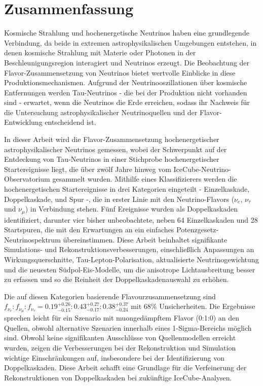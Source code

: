 \chapter{Zusammenfassung}
Kosmische Strahlung und hochenergetische Neutrinos haben eine grundlegende Verbindung, da beide in extremen astrophysikalischen Umgebungen entstehen, in denen kosmische Strahlung mit Materie oder Photonen in der Beschleunigungsregion interagiert und Neutrinos erzeugt. Die Beobachtung der Flavor-Zusammensetzung von Neutrinos bietet wertvolle Einblicke in diese Produktionsmechanismen. Aufgrund der Neutrinooszillationen über kosmische Entfernungen werden Tau-Neutrinos - die bei der Produktion nicht vorhanden sind - erwartet, wenn die Neutrinos die Erde erreichen, sodass ihr Nachweis für die Untersuchung astrophysikalischer Neutrinoquellen und der Flavor-Entwicklung entscheidend ist.

In dieser Arbeit wird die Flavor-Zusammensetzung hochenergetischer astrophysikalischer Neutrinos gemessen, wobei der Schwerpunkt auf der Entdeckung von Tau-Neutrinos in einer Stichprobe hochenergetischer Startereignisse liegt, die über zwölf Jahre hinweg vom IceCube-Neutrino-Observatorium gesammelt wurden. Mithilfe eines Klassifizierers werden die hochenergetischen Startereignisse in drei Kategorien eingeteilt - Einzelkaskade, Doppelkaskade, und Spur -, die in erster Linie mit den Neutrino-Flavors (\( \nu_e \), \( \nu_\tau \) und \( \nu_\mu \)) in Verbindung stehen. Fünf Ereignisse wurden als Doppelkaskaden identifiziert, darunter vier bisher unbeobachtete, neben 64 Einzelkaskaden und 28 Startspuren, die mit den Erwartungen an ein einfaches Potenzgesetz-Neutrinospektrum übereinstimmen. Diese Arbeit beinhaltet signifikante Simulations- und Rekonstruktionsverbesserungen, einschließlich Anpassungen an Wirkungsquerschnitte, Tau-Lepton-Polarisation, aktualisierte Neutrinogewichtung und die neuesten Südpol-Eis-Modelle, um die anisotrope Lichtausbreitung besser zu erfassen und so die Reinheit der Doppelkaskadenauswahl zu erhöhen.

Die auf diesen Kategorien basierende Flavourzusammensetzung sind \( f_{\nu_e} : f_{\nu_{\mu}} : f_{\nu_{\tau}} = 0.19_{-0.15}^{+0.26} : 0.43_{-0.17}^{+0.27} : 0.38_{-0.24}^{+0.37} \) mit 68\% Unsicherheiten. Die Ergebnisse sprechen leicht für ein Szenario mit muongedämpftem Flavor (0:1:0) an den Quellen, obwohl alternative Szenarien innerhalb eines 1-Sigma-Bereichs möglich sind. Obwohl keine signifikanten Ausschlüsse von Quellenmodellen erreicht wurden, zeigen die Verbesserungen bei der Rekonstruktion und Simulation wichtige Einschränkungen auf, insbesondere bei der Identifizierung von Doppelkaskaden. Diese Arbeit schafft eine Grundlage für die Verfeinerung der Rekonstruktionen von Doppelkaskaden bei zukünftige IceCube-Analysen.

